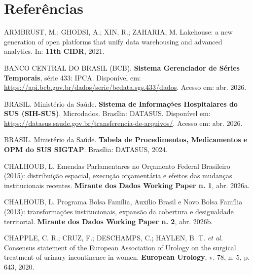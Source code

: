 \documentclass[12pt,a4paper,oneside]{article}
\begin{document}
\section*{Referências}\label{sec:ref}
\begin{singlespace}\small
\noindent\hangindent=1.25cm
ARMBRUST, M.; GHODSI, A.; XIN, R.; ZAHARIA, M. Lakehouse: a new
generation of open platforms that unify data warehousing and advanced
analytics. In: \textbf{11th CIDR}, 2021.\par\smallskip

\noindent\hangindent=1.25cm
BANCO CENTRAL DO BRASIL (BCB). \textbf{Sistema Gerenciador de Séries
Temporais}, série 433: IPCA. Disponível em:
\url{https://api.bcb.gov.br/dados/serie/bcdata.sgs.433/dados}.
Acesso em: abr. 2026.\par\smallskip

\noindent\hangindent=1.25cm
BRASIL. Ministério da Saúde. \textbf{Sistema de Informações
Hospitalares do SUS (SIH-SUS)}. Microdados. Brasília: DATASUS.
Disponível em:
\url{https://datasus.saude.gov.br/transferencia-de-arquivos/}.
Acesso em: abr. 2026.\par\smallskip

\noindent\hangindent=1.25cm
BRASIL. Ministério da Saúde. \textbf{Tabela de Procedimentos,
Medicamentos e OPM do SUS \textemdash{} SIGTAP}. Brasília: DATASUS,
2024.\par\smallskip

\noindent\hangindent=1.25cm
CHALHOUB, L. Emendas Parlamentares no Orçamento Federal Brasileiro
(2015): distribuição espacial, execução orçamentária
e efeitos das mudanças institucionais recentes.
\textbf{Mirante dos Dados \textemdash{} Working Paper n. 1}, abr.
2026a.\par\smallskip

\noindent\hangindent=1.25cm
CHALHOUB, L. Programa Bolsa Família, Auxílio Brasil e Novo Bolsa
Família (2013): transformações institucionais,
expansão da cobertura e desigualdade territorial.
\textbf{Mirante dos Dados \textemdash{} Working Paper n. 2}, abr.
2026b.\par\smallskip

\noindent\hangindent=1.25cm
CHAPPLE, C. R.; CRUZ, F.; DESCHAMPS, C.; HAYLEN, B. T. \textit{et al.}
Consensus statement of the European Association of Urology on the
surgical treatment of urinary incontinence in women.
\textbf{European Urology}, v. 78, n. 5, p. 643, 2020.\par\smallskip


\end{singlespace}
\end{document}
